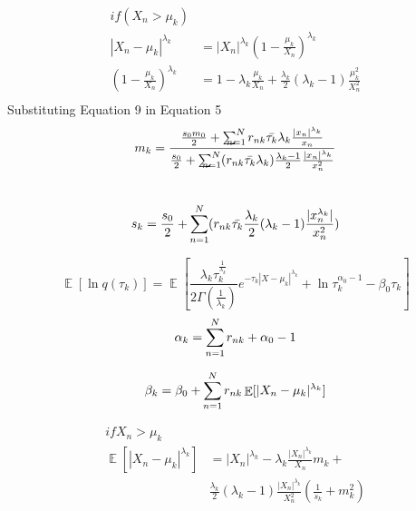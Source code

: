 \documentclass[conference]{IEEEtran}
\begin{document}
\begin{equation}
    \begin{split}
        if (X_n>\mu_k)\\
        |X_n-\mu_k|^{\lambda_k} &= |X_n|^{\lambda_k}(1 - \frac{\mu_k}{X_n})^{\lambda_k}\\
        (1 - \frac{\mu_k}{X_n})^{\lambda_k} &= 1 - \lambda_k \frac{\mu_k}{X_n} + \frac{\lambda_k}{2}(\lambda_k-1) \frac{\mu_k^2}{X_n^2}\\
    \end{split}
\end{equation}
Substituting Equation 9 in Equation 5
\begin{equation}
    \begin{split}
        m_k = \frac{\frac{s_0m_0}{2} + \sum_{\mathclap{n=1}}^{N}r_{nk}\bar{\tau_k}\lambda_k\frac{|x_n|^{\lambda_k}}{x_n}}
        {\frac{s_0}{2} + \sum_{\mathclap{n=1}}^{N}(r_{nk}\bar{\tau_k}\lambda_k)\frac{\lambda_k-1}{2}\frac{|x_n|^{\lambda_k}}{x_n^2}}\\\\
    \end{split}
\end{equation}

\begin{equation}
    s_k = \frac{s_0}{2} + \sum_{\mathclap{n=1}}^{N}(r_{nk}\bar{\tau_k}\frac{\lambda_k}{2}(\lambda_k-1)\frac{|x_n^{\lambda_k}|}{x_n^2})
\end{equation}

\begin{equation}
    \mathop{\mathbb{E}}[\ln q(\tau_k)] = \mathop{\mathbb{E}}[\frac{\lambda_k \tau_k^{\frac{1}{\lambda_k}}}{2\Gamma(\frac{1}{\lambda_k})} e ^ {-\tau_k |X-\mu_k|^{\lambda_k}} + \ln\tau_k^{\alpha_0 - 1} - \beta_0 \tau_k]
\end{equation}
\begin{equation}
    \begin{split}
        \alpha_k = \sum_{\mathclap{n=1}}^{N} r_{nk} + \alpha_0 - 1
    \end{split}
\end{equation}

\begin{equation}
    \beta_k = \beta_0 + \sum_{\mathclap{n=1}}^{N} r_{nk} \mathop{\mathbb{E}}[|X_n - \mu_k|^{\lambda_k}]
\end{equation}

\begin{equation}
    \begin{split}
        if X_n > \mu_k\\
        \mathop{\mathbb{E}}[|X_n - \mu_k|^{\lambda_k}] &= |X_n|^{\lambda_k} - \lambda_k \frac{|X_n|^{\lambda_k}}{X_n} m_k + \\
        &\frac{\lambda_k}{2} (\lambda_k - 1) \frac{|X_n|^{\lambda_k}}{X_n^2}(\frac{1}{s_k} + m_k^2)    
    \end{split}
\end{equation}
\end{document}
